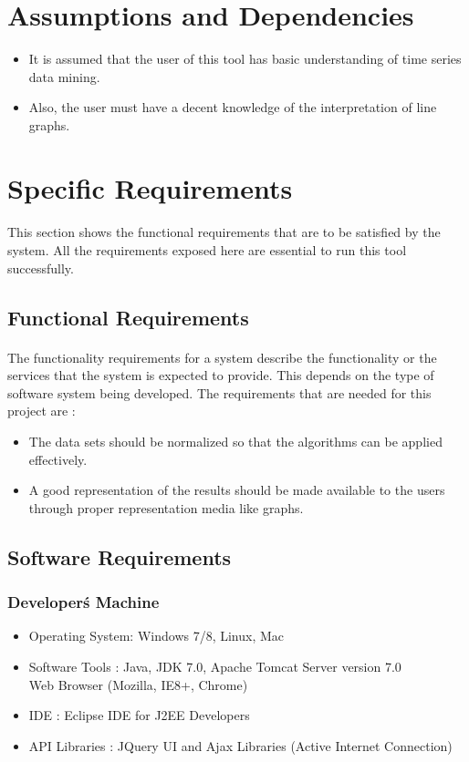 \documentclass[12pt,a4paper]{report}
\begin{document}
\section{Assumptions and Dependencies}
 \begin{itemize}
\item{}It is assumed that the user of this tool has basic understanding of time series data mining.
 
\item{}Also, the user must have a decent knowledge of the interpretation of line graphs.
\end{itemize}

\section{Specific Requirements}
\paragraph{}This section shows the functional requirements that are to be satisfied by the system. All the requirements exposed here are essential to run this tool successfully.

\subsection{Functional Requirements}
\paragraph{}The functionality requirements for a system describe the functionality or the services that the system is expected to provide. This depends on the type of software system being developed. 
The requirements that are needed for this project are :
 \begin{itemize}
\item The data sets should be normalized so that the algorithms can be applied effectively.
\item A good representation of the results should be made available to the users through proper representation media like graphs.
\end{itemize}

\subsection{Software Requirements}
\subsubsection{Developer\'s Machine}
\begin{itemize}
\item{	Operating System: Windows 7/8, Linux, Mac}
\item{  Software Tools : Java, JDK 7.0, Apache Tomcat Server version 7.0\\ Web Browser (Mozilla, IE8+, Chrome)} 
\item {IDE : Eclipse IDE for J2EE Developers}
\item {API Libraries : }JQuery UI and Ajax Libraries (Active Internet Connection)

\end{itemize}
\end{document}
